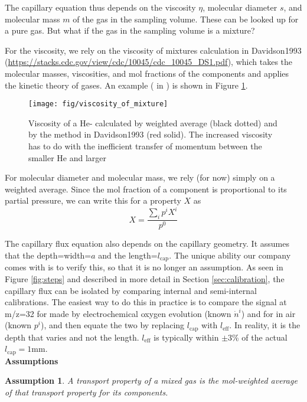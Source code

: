 \documentclass{article}
\newtheorem{assumption}{Assumption}
\begin{document}
The capillary equation thus depends on the viscosity $\eta$, molecular diameter $s$, and molecular mass $m$ of the gas in the sampling volume. These can be looked up for a pure gas. But what if the gas in the sampling volume is a mixture? 

For the viscosity, we rely on the viscosity of mixtures calculation in Davidson1993 (\url{https://stacks.cdc.gov/view/cdc/10045/cdc_10045_DS1.pdf}), which takes the molecular masses, viscosities, and mol fractions of the components and applies the kinetic theory of gases. An example ( in ) is shown in Figure \ref{fig:eta}.

\begin{figure}
	\centering
	\texttt{[image: fig/viscosity\_of\_mixture]}
	\caption{Viscosity of a He- calculated by weighted average (black dotted) and by the method in Davidson1993 (red solid). The increased viscosity has to do with the inefficient transfer of momentum between the smaller He and larger }
	\label{fig:eta}
\end{figure}

For molecular diameter and molecular mass, we rely (for now) simply on a weighted average. Since the mol fraction of a component is proportional to its partial pressure, we can write this for a property $X$ as
\begin{equation}
X = \frac{\sum_i p^i X^i}{p^0}
\end{equation}

The capillary flux equation also depends on the capillary geometry. It assumes that the depth=width=$a$ and the length=$l_\text{cap}$. The unique ability our company comes with is to verify this, so that it is no longer an assumption. As seen in Figure \ref{fig:steps} and described in more detail in Section \ref{sec:calibration}, the capillary flux can be isolated by comparing internal and semi-internal calibrations. The easiest way to do this in practice is to compare the signal at m/z=32 for  made by electrochemical oxygen evolution (known $\dot{n}^i$) and for  in air (known $p^i$), and then equate the two by replacing $l_\text{cap}$ with $l_\text{eff}$. In reality, it is the depth that varies and not the length. $l_\text{eff}$ is typically within $\pm$3\% of the actual $l_\text{cap}=1$mm.\\

\noindent\textbf{Assumptions}

\begin{assumption}
	A transport property of a mixed gas is the mol-weighted average of that transport property for its components.\label{ass:gas_average}
\end{assumption}
\end{document}
